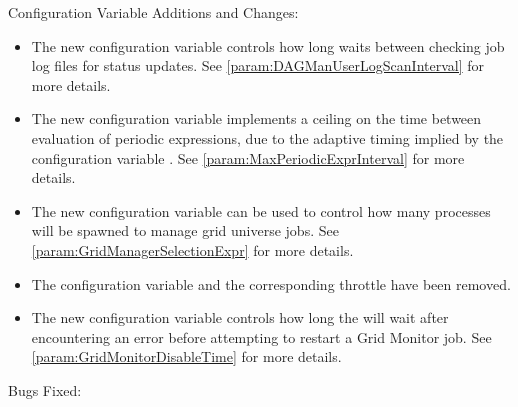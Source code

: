 \noindent Configuration Variable Additions and Changes:

\begin{itemize}

\item The new configuration variable 
controls how long  waits between checking job log files
for status updates.
See \ref{param:DAGManUserLogScanInterval} for more details.

\item The new configuration variable 
  implements a ceiling on the time between evaluation of periodic expressions,
  due to the adaptive timing implied by the configuration variable
  .
  See \ref{param:MaxPeriodicExprInterval} for more details.

\item The new configuration variable 
can be used to control how many  processes will be
spawned to manage grid universe jobs. 
See \ref{param:GridManagerSelectionExpr} for more details.

\item The configuration variable
 and the
corresponding throttle 
have been removed.

\item The new configuration variable 
controls how long the  will wait after encountering
an error before attempting to restart a Grid Monitor job.
See \ref{param:GridMonitorDisableTime} for more details.

\end{itemize}

\noindent Bugs Fixed:

